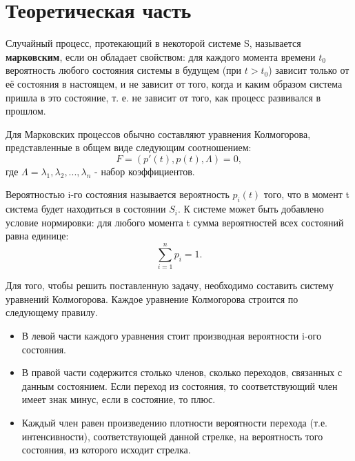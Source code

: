 \chapter{Теоретическая часть}

Случайный процесс, протекающий в некоторой системе S, называется \textbf{марковским}, 
если он обладает свойством: для каждого момента времени $t_0$ вероятность любого состояния 
системы в будущем (при $t > t_0$) зависит только от её состояния в настоящем, и не зависит 
от того, когда и каким образом система пришла в это состояние, т. е. не зависит от того, 
как процесс развивался в прошлом. 

Для Марковских процессов обычно составляют уравнения Колмогорова, представленные 
в общем виде следующим соотношением:
$$
	F = (p'(t), p(t), \Lambda) = 0,
$$
где $\Lambda = \lambda_1, \lambda_2, ..., \lambda_n$ - набор коэффициентов.

Вероятностью i-го состояния называется вероятность $p_i(t)$ того, что в момент t система будет 
находиться в состоянии $S_i$. К системе может быть добавлено условие нормировки: для любого
момента t сумма вероятностей всех состояний равна единице:
$$
\sum_{i = 1}^n p_i = 1.
$$

Для того, чтобы решить поставленную задачу, необходимо составить систему
уравнений Колмогорова. Каждое уравнение Колмогорова строится по следующему правилу.
\begin{itemize}
	\item В левой части каждого уравнения стоит производная вероятности i-ого состояния.
	
	\item В правой части содержится столько членов, сколько переходов, связанных с данным состоянием. 
	Если переход из состояния, то соответствующий член имеет знак минус, если в состояние, то плюс. 
	
	\item Каждый член равен произведению плотности вероятности перехода (т.е. интенсивности), 
	соответствующей данной стрелке, на вероятность того состояния, из которого исходит стрелка.
\end{itemize}
